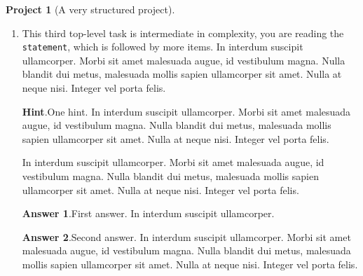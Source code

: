 \documentclass{amsart}
\theoremstyle{plain}%
\theoremstyle{definition}%
\newtheorem{project}[theorem]{Project}
\theoremstyle{remark}%
\newcommand{\blocktitlefont}{\relax}
\newcommand{\mono}[1]{\texttt{#1}}
\numberwithin{equation}{section}
\begin{document}
\begin{project}[A very structured project]
\begin{enumerate}[font=\bfseries,label=(\alph*),ref=\alph*]
\begin{enumerate}[font=\bfseries,label=(\roman*),ref=\theenumi.\roman*]
\begin{enumerate}[font=\bfseries,label=(\Alph*),ref=\theenumi.\theenumii.\Alph*]
\par
In interdum suscipit ullamcorper. Morbi sit amet malesuada augue, id vestibulum magna. Nulla blandit dui metus, malesuada mollis sapien ullamcorper sit amet. Nulla at neque nisi. Integer vel porta felis.%
\end{enumerate}%
The conclusion of the structured subtask.  In interdum suscipit ullamcorper. Morbi sit amet malesuada augue, id vestibulum magna. Nulla blandit dui metus, malesuada mollis sapien ullamcorper sit amet. Nulla at neque nisi. Integer vel porta felis.%
\item{}A simple task as the last subtask.  In interdum suscipit ullamcorper. Morbi sit amet malesuada augue, id vestibulum magna. Nulla blandit dui metus, malesuada mollis sapien ullamcorper sit amet. Nulla at neque nisi. Integer vel porta felis.%
\end{enumerate}%
This concludes our structured second task.  In interdum suscipit ullamcorper. Morbi sit amet malesuada augue, id vestibulum magna. Nulla blandit dui metus, malesuada mollis sapien ullamcorper sit amet. Nulla at neque nisi. Integer vel porta felis.%
\item{}This third top-level task is intermediate in complexity, you are reading the \mono{statement}, which is followed by more items. In interdum suscipit ullamcorper. Morbi sit amet malesuada augue, id vestibulum magna. Nulla blandit dui metus, malesuada mollis sapien ullamcorper sit amet. Nulla at neque nisi. Integer vel porta felis.%
\par\smallskip%
\noindent\textbf{\blocktitlefont Hint}.\hypertarget{project-structured-7-2}{}\quad{}One hint.  In interdum suscipit ullamcorper. Morbi sit amet malesuada augue, id vestibulum magna. Nulla blandit dui metus, malesuada mollis sapien ullamcorper sit amet. Nulla at neque nisi. Integer vel porta felis.%
\par
In interdum suscipit ullamcorper. Morbi sit amet malesuada augue, id vestibulum magna. Nulla blandit dui metus, malesuada mollis sapien ullamcorper sit amet. Nulla at neque nisi. Integer vel porta felis.%
\par\smallskip%
\noindent\textbf{\blocktitlefont Answer 1}.\hypertarget{project-structured-7-3}{}\quad{}First answer.  In interdum suscipit ullamcorper.%
\par\smallskip%
\noindent\textbf{\blocktitlefont Answer 2}.\hypertarget{project-structured-7-4}{}\quad{}Second answer.  In interdum suscipit ullamcorper. Morbi sit amet malesuada augue, id vestibulum magna. Nulla blandit dui metus, malesuada mollis sapien ullamcorper sit amet. Nulla at neque nisi. Integer vel porta felis.%

\end{enumerate}
\end{project}
\end{document}
